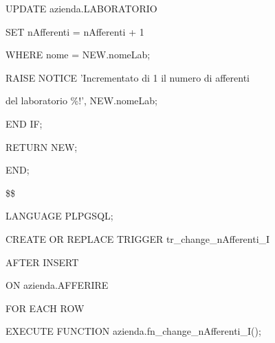 \begin{flushleft}
\begin{description}
\begin{description}
\begin{description}
                        \item UPDATE azienda.LABORATORIO
                        \item SET nAfferenti = nAfferenti + 1
                        \item WHERE nome = NEW.nomeLab;
                        \vspace{0.5cm}
                        \item RAISE NOTICE 'Incrementato di 1 il numero di afferenti
                        \item \hspace{2.3cm} del laboratorio \%!', NEW.nomeLab;
                    \end{description}
                    \item END IF;
                \end{description}

                \vspace{0.2cm}

                \begin{description}
                    \item RETURN NEW;
                \end{description}
            \item END;
            \item \$\$
            \item LANGUAGE PLPGSQL;
            \end{description}
        \end{flushleft}
    \normalfont

    \ttfamily
        \begin{flushleft}
            \begin{description}
                \item CREATE OR REPLACE TRIGGER tr\_change\_nAfferenti\_I
                \item AFTER INSERT
                \item ON azienda.AFFERIRE
                \item FOR EACH ROW
                \item EXECUTE FUNCTION azienda.fn\_change\_nAfferenti\_I();
            \end{description}
        \end{flushleft}
    \normalfont

